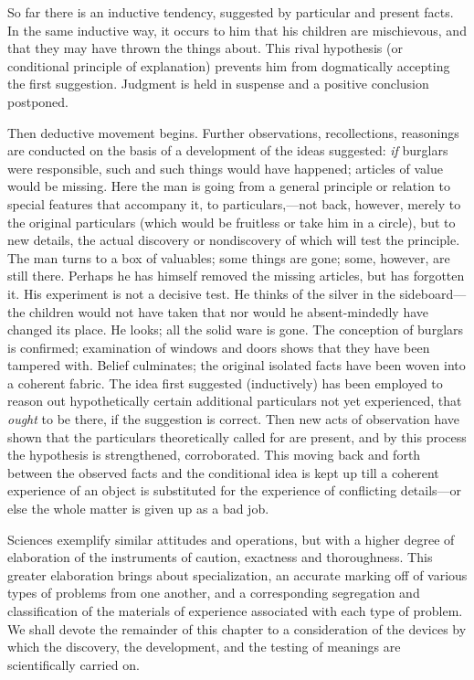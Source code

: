 \documentclass[letterpaper]{book}
\begin{document}

So far there is an inductive tendency, suggested by particular and
present facts. In the same inductive way, it occurs to him that his
children are mischievous, and that they may have thrown the things
about. This rival hypothesis (or conditional principle of explanation)
prevents him from dogmatically accepting the first suggestion. Judgment
is held in suspense and a positive conclusion
postponed.


Then deductive movement begins. Further observations, recollections,
reasonings are conducted on the basis of a development of the ideas
suggested: \emph{if} burglars were responsible, such and such things
would have happened; articles of value would be missing. Here the man is
going from a general principle or relation to special features that
accompany it, to particulars,---not back, however, merely to the
original particulars (which would be fruitless or take him in a circle),
but to new details, the actual discovery or nondiscovery of which will
test the principle. The man turns to a box of valuables; some things are
gone; some, however, are still there. Perhaps he has himself removed the
missing articles, but has forgotten it. His experiment is not a decisive
test. He thinks of the silver in the sideboard---the children would not
have taken that nor would he absent-mindedly have changed its place. He
looks; all the solid ware is gone. The conception of burglars is
confirmed; examination of windows and doors shows that they have been
tampered with. Belief culminates; the original isolated facts have been
woven into a coherent fabric. The idea first suggested (inductively) has
been employed to reason out hypothetically certain additional
particulars not yet experienced, that \emph{ought} to be there, if the
suggestion is correct. Then new acts of observation have shown that the
particulars theoretically called for are present, and by this process
the hypothesis is strengthened, corroborated. This moving back and forth
between the observed facts and the conditional idea is kept up till a
coherent experience of an object is substituted for the experience of
conflicting details---or else the whole matter is given up as a bad job.


Sciences exemplify similar attitudes and
operations,
but with a higher degree of elaboration of the instruments of caution,
exactness and thoroughness. This greater elaboration brings about
specialization, an accurate marking off of various types of problems
from one another, and a corresponding segregation and classification of
the materials of experience associated with each type of problem. We
shall devote the remainder of this chapter to a consideration of the
devices by which the discovery, the development, and the testing of
meanings are scientifically carried on.
\end{document}
